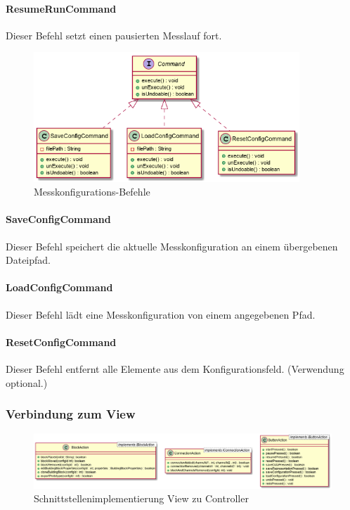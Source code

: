 \documentclass[parskip=full]{scrartcl}
\begin{document}
\paragraph{ResumeRunCommand}

Dieser Befehl setzt einen pausierten Messlauf fort.

\begin{figure}[htbp]
	\begin{center}
		\includegraphics[width = 10cm]{Grafiken/Commands4.png}
		\caption{Messkonfigurations-Befehle}
		\label{Commands4}
	\end{center}
\end{figure}

\paragraph{SaveConfigCommand}

Dieser Befehl speichert die aktuelle Messkonfiguration an einem übergebenen Dateipfad.

\paragraph{LoadConfigCommand}

Dieser Befehl lädt eine Messkonfiguration von einem angegebenen Pfad.

\paragraph{ResetConfigCommand}

Dieser Befehl entfernt alle Elemente aus dem Konfigurationsfeld. (Verwendung optional.)

\subsubsection{Verbindung zum View}

\begin{figure}[htbp]
	\begin{center}
		\includegraphics[width = 14cm]{Grafiken/View_Controller_Interface.png}
		\caption{Schnittstellenimplementierung View zu Controller}
		\label{View_Controller_Interface}
	\end{center}
\end{figure}
\end{document}
